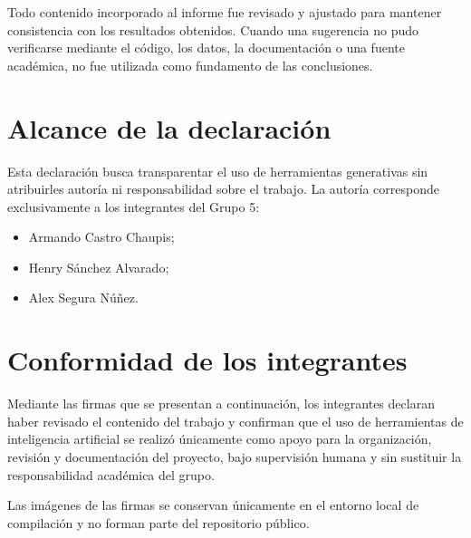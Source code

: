 Todo contenido incorporado al informe fue revisado y ajustado para
mantener consistencia con los resultados obtenidos. Cuando una sugerencia
no pudo verificarse mediante el código, los datos, la documentación o una
fuente académica, no fue utilizada como fundamento de las conclusiones.

\section*{Alcance de la declaración}

Esta declaración busca transparentar el uso de herramientas generativas
sin atribuirles autoría ni responsabilidad sobre el trabajo. La autoría
corresponde exclusivamente a los integrantes del Grupo 5:

\begin{itemize}
    \item Armando Castro Chaupis;
    \item Henry Sánchez Alvarado;
    \item Alex Segura Núñez.
\end{itemize}

\section*{Conformidad de los integrantes}

Mediante las firmas que se presentan a continuación, los integrantes
declaran haber revisado el contenido del trabajo y confirman que el uso
de herramientas de inteligencia artificial se realizó únicamente como
apoyo para la organización, revisión y documentación del proyecto, bajo
supervisión humana y sin sustituir la responsabilidad académica del grupo.

Las imágenes de las firmas se conservan únicamente en el entorno local de
compilación y no forman parte del repositorio público.

\vspace{1.2cm}


